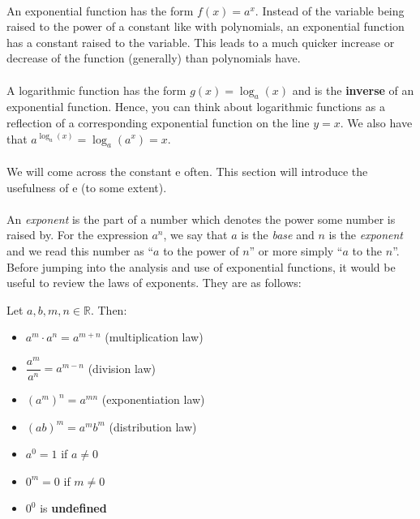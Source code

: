 \documentclass[12pt, a4paper, titlepage, twoside]{article}
\newcommand*{\R}{\mathbb{R}}
\newcommand*{\e}{\textrm{e}}
\begin{document}
	\paragraph{}
	An exponential function has the form $f(x) = a^x$. Instead of the variable being raised to the power of a constant like with
	polynomials, an exponential function has a constant raised to the variable. This leads to a much quicker increase or decrease of
	the function (generally) than polynomials have.
	
	\paragraph{}
	A logarithmic function has the form $g(x) = \log_a(x)$ and is the \textbf{inverse} of an exponential function. Hence, you can think about 
	logarithmic functions as a reflection of a corresponding exponential function on the line $y=x$. We also have that $a^{\log_a(x)} = 
	\log_a(a^x) = x$.
	
	\paragraph{}
	We will come across the constant $\e$ often. This section will introduce the usefulness of $\e$ (to some extent).
	
	\paragraph{}
	An \textit{exponent} is the part of a number which denotes the power some number is raised by. For the expression $a^n$, we
	say that $a$ is the \textit{base} and $n$ is the \textit{exponent} and we read this number as ``$a$ to the power of $n$'' or
	more simply ``$a$ to the $n$''. Before jumping into the analysis and use of exponential functions, it would be useful to review the laws 
	of exponents. They are as follows:\\
	
	\begin{kp}
		Let $a, b, m, n \in \R$. Then:
		
		\begin{itemize}
			\item $a^m \cdot a^n = a^{m+n}$ (multiplication law)
			\item $\dfrac{a^m}{a^n} = a^{m-n}$ (division law)
			\item ${(a^m)}^n = a^{mn}$ (exponentiation law)
			\item $(ab)^m = a^m b^m$ (distribution law)
			\item $a^0 = 1$ if $a \neq 0$
			\item $0^m = 0$ if $m \neq 0$
			\item $0^0$ is \textbf{undefined}
		\end{itemize}
	\end{kp}
	
\end{document}
